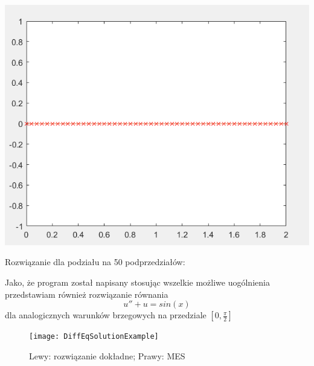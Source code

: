 \documentclass [dvipsnames] {article}
\begin{document}
	\begin {flushleft}
	\includegraphics{DiffEqSolution1}	
	\end{flushleft}
	\begin {center}
		Rozwiązanie dla podziału na 50 podprzedziałów:
	\end {center}
	
	\newpage
	
	Jako, że program został napisany stosując wszelkie możliwe uogólnienia przedstawiam również rozwiązanie równania 
	$$ u'' + u = sin(x)$$
	dla analogicznych warunków brzegowych na przedziale $[0, \frac {\pi}{2}]$
	
	\begin{figure}[h!]
	\centering
	\texttt{[image: DiffEqSolutionExample]}
	\caption{Lewy: rozwiązanie dokładne;  Prawy: MES}
	\label{fig:method}
	\end{figure}
	
\end{document}
